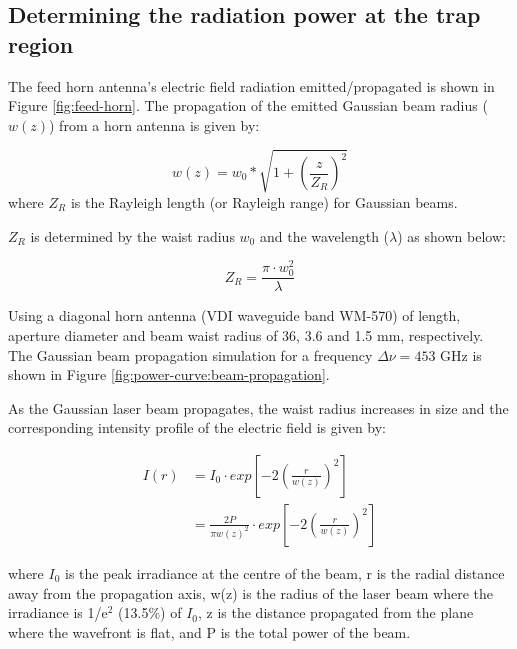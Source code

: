 \subsection{Determining the radiation power at the trap region}
\label{subsec:rot:power}



The feed horn antenna's electric field radiation emitted/propagated is shown in
Figure \ref{fig:feed-horn}. The propagation of the emitted Gaussian beam radius
($w(z)$) from a horn antenna is given by:



\begin{equation}
    w(z) = w_0 * \sqrt{1 + \left( \frac{z}{Z_R} \right) ^2}
    \label{eqn:beam-propagation}
\end{equation}
where $Z_R$ is the Rayleigh length (or Rayleigh range) for Gaussian beams.

$Z_R$  is determined by the waist radius $w_0$ and the wavelength ($\lambda$) as shown below:

\[Z_R = \frac{\pi \cdot w_0^2}{\lambda}\]

Using a diagonal horn antenna (VDI waveguide band WM-570) of length, aperture
diameter and beam waist radius of 36, 3.6 and 1.5 mm, respectively. The
Gaussian beam propagation simulation for a frequency $\Delta \nu = 453$ GHz is
shown in Figure \ref{fig:power-curve:beam-propagation}.



As the Gaussian laser beam propagates, the waist radius increases in size and
the corresponding intensity profile of the electric field is given by:

\begin{equation}
    \begin{split}
        I(r) & = I_0 \cdot exp \left[ -2 \left (\frac{r}{w(z)}\right ) ^2\right] \\
        & = \frac{2P}{\pi w(z)^2}
        \cdot exp \left[ -2 \left (\frac{r}{w(z)}\right ) ^2\right]
    \end{split}
    \label{eqn:beam-propagation:intensity}
\end{equation}

where $I_0$ is the peak irradiance at the centre of the beam, r is the radial
distance away from the propagation axis, w(z) is the radius of the laser beam
where the irradiance is 1/e$^2$ (13.5\%) of $I_0$, z is the distance propagated
from the plane where the wavefront is flat, and P is the total power of the
beam.\\

